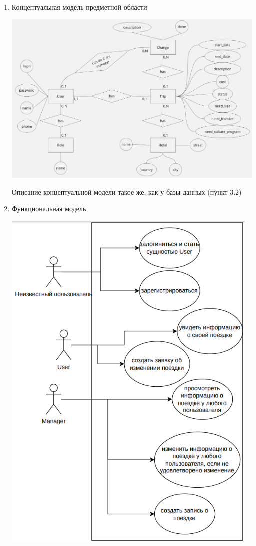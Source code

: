 \documentclass[a4paper,12pt]{article}
\begin{document}
\begin{enumerate}
    \item Концептуальная модель предметной области

          \includegraphics[width=\textwidth]{media/ER.jpg}

          Описание концептуальной модели такое же, как у базы данных (пункт 3.2)

    \item Функциональная модель

          \includegraphics[width=4.856262029746282in, height=6.687497812773404in]{media/f_model.png}


\end{enumerate}
\end{document}
